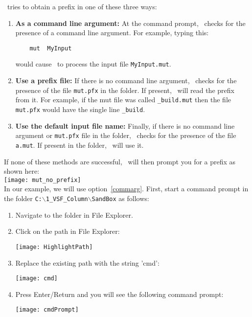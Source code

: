 \pagebreak
\mut\ tries to obtain a prefix in one of these three ways:
\begin{enumerate}
    \item \textbf{As a command line argument:} \label{commarg} At the command prompt, \mut\ checks for the presence of a command line argument.  For example, typing this:
\begin{verbatim}
    mut  MyInput
\end{verbatim}
        would cause \mut\ to process the input file \texttt{MyInput.mut}.
    \item \textbf{Use a prefix file:} If there is no command line argument, \mut\ checks for the presence of the file \texttt{mut.pfx} in the folder.  If present, \mut\ will read the prefix from it. For example, if the mut file was called \texttt{\_build.mut} then the file \texttt{mut.pfx} would have the single line \texttt{\_build}.
    \item \textbf{Use the default input file name:} Finally, if there is no command line argument or \texttt{mut.pfx} file in the folder, \mut\ checks for the presence of the file \texttt{a.mut}.  If present in the folder, \mut\ will use it.
\end{enumerate}
If none of these methods are successful, \mut\ will then prompt you for a prefix as shown here:
        \vspace{.2in} \\
        \texttt{[image: mut\_no\_prefix]}
        \vspace{.2in} \\




 In our example, we will use option~\ref{commarg}.  First, start a command prompt in the folder \texttt{C:$\backslash$1\_VSF\_Column$\backslash$SandBox} as follows:
\begin{enumerate}
    \item  Navigate to the folder in File Explorer.
   \item  Click on the path in File Explorer:

        \texttt{[image: HighlightPath]}

    \item  Replace the existing path with the string 'cmd':

        \texttt{[image: cmd]}

    \item Press Enter/Return and you will see the following command prompt:

        \texttt{[image: cmdPrompt]}

\end{enumerate}

